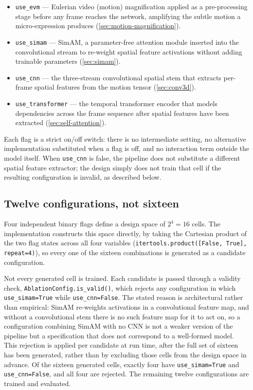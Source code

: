 \begin{itemize}
	\item \texttt{use\_evm} --- Eulerian video (motion) magnification applied as a pre-processing stage before any frame reaches the network, amplifying the subtle motion a micro-expression produces (\autoref{sec:motion-magnification}).
	\item \texttt{use\_simam} --- SimAM, a parameter-free attention module inserted into the convolutional stream to re-weight spatial feature activations without adding trainable parameters (\autoref{sec:simam}).
	\item \texttt{use\_cnn} --- the three-stream convolutional spatial stem that extracts per-frame spatial features from the motion tensor (\autoref{sec:conv3d}).
	\item \texttt{use\_transformer} --- the temporal transformer encoder that models dependencies across the frame sequence after spatial features have been extracted (\autoref{sec:self-attention}).
\end{itemize}

Each flag is a strict on/off switch: there is no intermediate setting, no alternative implementation substituted when a flag is off, and no interaction term outside the model itself. When \texttt{use\_cnn} is false, the pipeline does not substitute a different spatial feature extractor; the design simply does not train that cell if the resulting configuration is invalid, as described below.

\subsection{Twelve configurations, not sixteen}
\label{sec:twelve-configs}

Four independent binary flags define a design space of $2^4 = 16$ cells. The implementation constructs this space directly, by taking the Cartesian product of the two flag states across all four variables (\verb|itertools.product([False, True], repeat=4)|), so every one of the sixteen combinations is generated as a candidate configuration.

Not every generated cell is trained. Each candidate is passed through a validity check, \verb|AblationConfig.is_valid()|, which rejects any configuration in which \texttt{use\_simam=True} while \texttt{use\_cnn=False}. The stated reason is architectural rather than empirical: SimAM re-weights activations in a convolutional feature map, and without a convolutional stem there is no such feature map for it to act on, so a configuration combining SimAM with no CNN is not a weaker version of the pipeline but a specification that does not correspond to a well-formed model. This rejection is applied per candidate at run time, after the full set of sixteen has been generated, rather than by excluding those cells from the design space in advance. Of the sixteen generated cells, exactly four have \texttt{use\_simam=True} and \texttt{use\_cnn=False}, and all four are rejected. The remaining twelve configurations are trained and evaluated.

